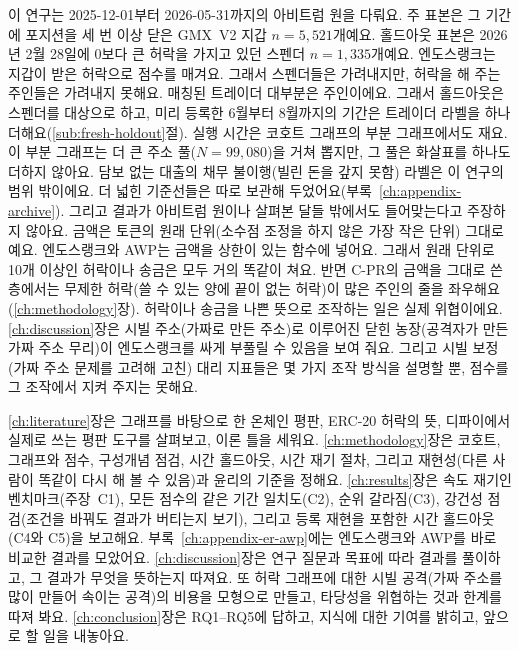 
이 연구는 2025-12-01부터 2026-05-31까지의 아비트럼 원을 다뤄요. 주 표본은 그 기간에 포지션을 세 번 이상 닫은 GMX~V2 지갑 $n=5{,}521$개예요. 홀드아웃 표본은 2026년 2월 28일에 0보다 큰 허락을 가지고 있던 스펜더 $n=1{,}335$개예요. 엔도스랭크는 지갑이 받은 허락으로 점수를 매겨요. 그래서 스펜더들은 가려내지만, 허락을 해 주는 주인들은 가려내지 못해요. 매칭된 트레이더 대부분은 주인이에요. 그래서 홀드아웃은 스펜더를 대상으로 하고, 미리 등록한 6월부터 8월까지의 기간은 트레이더 라벨을 하나 더해요(\ref{sub:fresh-holdout}절). 실행 시간은 코호트 그래프의 부분 그래프에서도 재요. 이 부분 그래프는 더 큰 주소 풀($N=99{,}080$)을 거쳐 뽑지만, 그 풀은 화살표를 하나도 더하지 않아요. 담보 없는 대출의 채무 불이행(빌린 돈을 갚지 못함) 라벨은 이 연구의 범위 밖이에요. 더 넓힌 기준선들은 따로 보관해 두었어요(부록~\ref{ch:appendix-archive}). 그리고 결과가 아비트럼 원이나 살펴본 달들 밖에서도 들어맞는다고 주장하지 않아요. 금액은 토큰의 원래 단위(소수점 조정을 하지 않은 가장 작은 단위) 그대로예요. 엔도스랭크와 AWP는 금액을 상한이 있는 함수에 넣어요. 그래서 원래 단위로 10개 이상인 허락이나 송금은 모두 거의 똑같이 쳐요. 반면 C-PR의 금액을 그대로 쓴 층에서는 무제한 허락(쓸 수 있는 양에 끝이 없는 허락)이 많은 주인의 줄을 좌우해요(\ref{ch:methodology}장). 허락이나 송금을 나쁜 뜻으로 조작하는 일은 실제 위협이에요. \ref{ch:discussion}장은 시빌 주소(가짜로 만든 주소)로 이루어진 닫힌 농장(공격자가 만든 가짜 주소 무리)이 엔도스랭크를 싸게 부풀릴 수 있음을 보여 줘요. 그리고 시빌 보정(가짜 주소 문제를 고려해 고친) 대리 지표들은 몇 가지 조작 방식을 설명할 뿐, 점수를 그 조작에서 지켜 주지는 못해요.


\ref{ch:literature}장은 그래프를 바탕으로 한 온체인 평판, ERC-20 허락의 뜻, 디파이에서 실제로 쓰는 평판 도구를 살펴보고, 이론 틀을 세워요. \ref{ch:methodology}장은 코호트, 그래프와 점수, 구성개념 점검, 시간 홀드아웃, 시간 재기 절차, 그리고 재현성(다른 사람이 똑같이 다시 해 볼 수 있음)과 윤리의 기준을 정해요. \ref{ch:results}장은 속도 재기인 벤치마크(주장~C1), 모든 점수의 같은 기간 일치도(C2), 순위 갈라짐(C3), 강건성 점검(조건을 바꿔도 결과가 버티는지 보기), 그리고 등록 재현을 포함한 시간 홀드아웃(C4와 C5)을 보고해요. 부록~\ref{ch:appendix-er-awp}에는 엔도스랭크와 AWP를 바로 비교한 결과를 모았어요. \ref{ch:discussion}장은 연구 질문과 목표에 따라 결과를 풀이하고, 그 결과가 무엇을 뜻하는지 따져요. 또 허락 그래프에 대한 시빌 공격(가짜 주소를 많이 만들어 속이는 공격)의 비용을 모형으로 만들고, 타당성을 위협하는 것과 한계를 따져 봐요. \ref{ch:conclusion}장은 RQ1--RQ5에 답하고, 지식에 대한 기여를 밝히고, 앞으로 할 일을 내놓아요.

